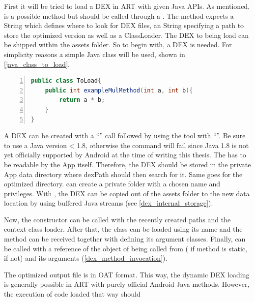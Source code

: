 First it will be tried to load a DEX in ART with given Java APIs.
As mentioned,  is a possible method but should be called
through a . The method expects a  String which defines where to look for DEX files, an  String specifying a path to store the optimized version as well as a  ClassLoader.
The DEX to being load can be shipped within the assets folder.
So to begin with, a DEX is needed. For simplicity reasons a simple Java class will be used, shown in \autoref{java_class_to_load}.
\begin{lstlisting}[language=Java, caption=Java Class to load, label=java_class_to_load, numbers=left]
public class ToLoad{
    public int exampleMulMethod(int a, int b){
        return a * b;
    }
}
\end{lstlisting}
A DEX can be created with a ``'' call followed by
using the  tool with ``''. Be sure to use a Java version < 1.8, otherwise the 
command will fail since Java 1.8 is not yet officially supported by Android at the time of writing this thesis.
The  has to be readable by the App itself. Therefore,
the DEX should be stored in the private App data directory where dexPath should then
search for it. Same goes for the optimized directory.
 can create a private folder with a chosen name
and privileges. With , the DEX can be
copied out of the assets folder to the new data location by using buffered Java streams (see \autoref{dex_internal_storage}).

Now, the  constructor can be called with the recently
created paths and the context class loader. After that, the class can be loaded
using its name and the method can be received together with defining its argument classes.
Finally,  can be called with a reference of the object of being called from ( if method is static,  if not) and its arguments (\autoref{dex_method_invocation}).

The optimized output file is in OAT format.
This way, the dynamic DEX loading is generally possible in ART with purely official
Android Java methods. However, the execution of code loaded that way should
